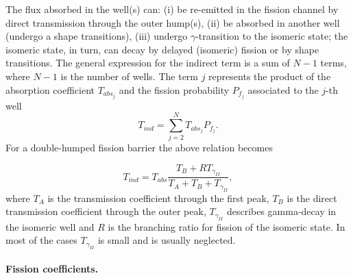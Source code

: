 The flux absorbed in the well(s) can: \newline
\qquad(i) be re-emitted in the fission channel by direct transmission
through the outer hump(s), \newline
\qquad(ii) be absorbed in another well (undergo a shape transitions),
\newline
\qquad(iii) undergo $\gamma$-transition to the isomeric state; the isomeric
state, in turn, can decay by delayed (isomeric) fission or by shape
transitions. The general expression for the indirect term is a sum of $N-1$
terms, where $N-1$ is the number of wells. The term $j$ represents the
product of the absorption coefficient $T_{abs_j}$ and the fission
probability $P_{f_j}$ associated to the $j$-th well
\begin{equation}
T_{ind}=\sum_{j=2}^{N}T_{abs_j}P_{f_j}.  \label{tf1}
\end{equation}
For a double-humped fission barrier the above relation becomes

\begin{equation}
T_{ind}=T_{abs}\frac{T_{B}+RT_{\gamma_{II}}} {T_{A}+T_{B}+T_{\gamma_{II}}},
\end{equation}
where $T_{A}$ is the transmission coefficient through the first peak, $T_{B}$
is the direct transmission coefficient through the outer peak, $T_{\gamma
_{II}}$ describes gamma-decay in the isomeric well and $R$ is the branching
ratio for fission of the isomeric state. In most of the cases $T_{\gamma
_{II}}$ is small and is usually neglected.

\medskip %

\paragraph*{Fission coefficients.}

